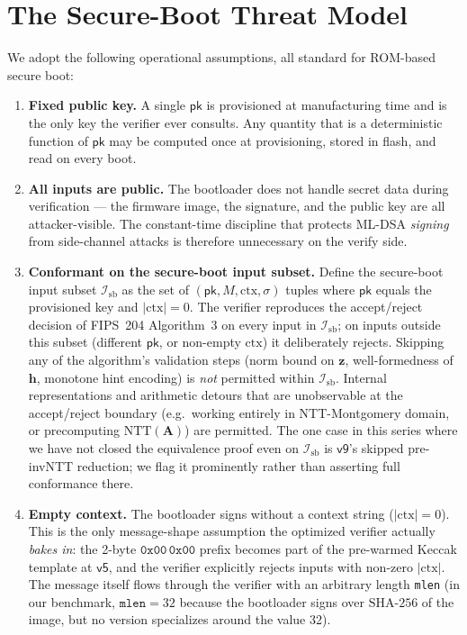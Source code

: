 \documentclass[11pt,a4paper]{article}
\newcommand{\NTT}{\mathrm{NTT}}
\begin{document}
\section{The Secure-Boot Threat Model}
\label{sec:secure-boot}

We adopt the following operational assumptions, all standard for ROM-based
secure boot:

\begin{enumerate}[leftmargin=*]
  \item \textbf{Fixed public key.} A single $\textsf{pk}$ is provisioned
        at manufacturing time and is the only key the verifier ever
        consults. Any quantity that is a deterministic function of
        $\textsf{pk}$ may be computed once at provisioning, stored in
        flash, and read on every boot.
  \item \textbf{All inputs are public.} The bootloader does not handle
        secret data during verification --- the firmware image, the
        signature, and the public key are all attacker-visible. The
        constant-time discipline that protects ML-DSA \emph{signing} from
        side-channel attacks is therefore unnecessary on the verify side.
  \item \textbf{Conformant on the secure-boot input subset.} Define
        the secure-boot input subset $\mathcal{I}_{\mathrm{sb}}$ as
        the set of $(\textsf{pk}, M, \mathrm{ctx}, \sigma)$ tuples
        where $\textsf{pk}$ equals the provisioned key and
        $|\mathrm{ctx}| = 0$. The verifier reproduces the
        accept/reject decision of FIPS~204 Algorithm~3 on every input
        in $\mathcal{I}_{\mathrm{sb}}$; on inputs outside this subset
        (different $\textsf{pk}$, or non-empty $\mathrm{ctx}$) it
        deliberately rejects. Skipping any of the algorithm's
        validation steps (norm bound on $\mathbf{z}$, well-formedness
        of $\mathbf{h}$, monotone hint encoding) is \emph{not}
        permitted within $\mathcal{I}_{\mathrm{sb}}$. Internal
        representations and arithmetic detours that are unobservable
        at the accept/reject boundary (e.g.\ working entirely in
        NTT-Montgomery domain, or precomputing $\NTT(\mathbf{A})$) are
        permitted. The one case in this series where we have not
        closed the equivalence proof even on $\mathcal{I}_{\mathrm{sb}}$
        is $\textsf{v9}$'s skipped pre-invNTT reduction; we flag it
        prominently rather than asserting full conformance there.
  \item \textbf{Empty context.} The bootloader signs without a context
        string ($|\mathrm{ctx}|=0$). This is the only message-shape
        assumption the optimized verifier actually \emph{bakes in}: the
        2-byte $\mathtt{0x00\,0x00}$ prefix becomes part of the
        pre-warmed Keccak template at $\textsf{v5}$, and the verifier
        explicitly rejects inputs with non-zero $|\mathrm{ctx}|$. The
        message itself flows through the verifier with an arbitrary
        length \texttt{mlen} (in our benchmark, $\mathtt{mlen}=32$
        because the bootloader signs over $\mathrm{SHA}\text{-}256$ of
        the image, but no version specializes around the value 32).
\end{enumerate}
\end{document}
